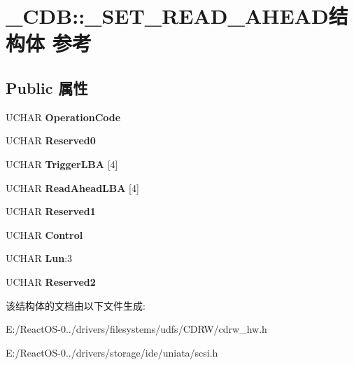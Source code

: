 \hypertarget{struct___c_d_b_1_1___s_e_t___r_e_a_d___a_h_e_a_d}{}\section{\+\_\+\+C\+DB\+:\+:\+\_\+\+S\+E\+T\+\_\+\+R\+E\+A\+D\+\_\+\+A\+H\+E\+A\+D结构体 参考}
\label{struct___c_d_b_1_1___s_e_t___r_e_a_d___a_h_e_a_d}
\subsection*{Public 属性}
\begin{DoxyCompactItemize}
\item 
\mbox{\label{struct___c_d_b_1_1___s_e_t___r_e_a_d___a_h_e_a_d_ad8ba81f72ebe8a1a10d22deeaa35a694}} 
U\+C\+H\+AR {\bfseries Operation\+Code}
\item 
\mbox{\label{struct___c_d_b_1_1___s_e_t___r_e_a_d___a_h_e_a_d_a2ec38ec091b1def3c400817cf9f5aab0}} 
U\+C\+H\+AR {\bfseries Reserved0}
\item 
\mbox{\label{struct___c_d_b_1_1___s_e_t___r_e_a_d___a_h_e_a_d_a1a68f692e38b5317ddd495a6e7b95415}} 
U\+C\+H\+AR {\bfseries Trigger\+L\+BA} \mbox{[}4\mbox{]}
\item 
\mbox{\label{struct___c_d_b_1_1___s_e_t___r_e_a_d___a_h_e_a_d_a0f3a95edef0bde818b91ffda52be5ecd}} 
U\+C\+H\+AR {\bfseries Read\+Ahead\+L\+BA} \mbox{[}4\mbox{]}
\item 
\mbox{\label{struct___c_d_b_1_1___s_e_t___r_e_a_d___a_h_e_a_d_afe3ece49b95ed4ab581bc8b9ea940d52}} 
U\+C\+H\+AR {\bfseries Reserved1}
\item 
\mbox{\label{struct___c_d_b_1_1___s_e_t___r_e_a_d___a_h_e_a_d_a623b15cb96428c5340a6123b5e4f3c08}} 
U\+C\+H\+AR {\bfseries Control}
\item 
\mbox{\label{struct___c_d_b_1_1___s_e_t___r_e_a_d___a_h_e_a_d_a001008dba88861425326ca03194ab9a7}} 
U\+C\+H\+AR {\bfseries Lun}\+:3
\item 
\mbox{\label{struct___c_d_b_1_1___s_e_t___r_e_a_d___a_h_e_a_d_ad48c5f2fcfb4db2027013f7150f5f5bb}} 
U\+C\+H\+AR {\bfseries Reserved2}
\end{DoxyCompactItemize}


该结构体的文档由以下文件生成\+:\begin{DoxyCompactItemize}
\item 
E\+:/\+React\+O\+S-\/0../drivers/filesystems/udfs/\+C\+D\+R\+W/cdrw\+\_\+hw.\+h\item 
E\+:/\+React\+O\+S-\/0../drivers/storage/ide/uniata/scsi.\+h\end{DoxyCompactItemize}
